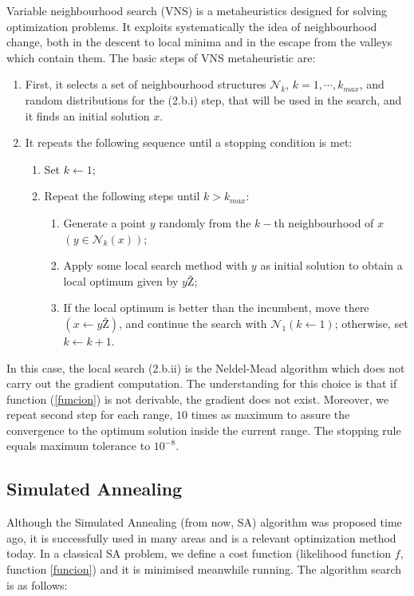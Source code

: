\documentclass{sig-alternate}
\begin{document}
Variable neighbourhood search (VNS) \cite{VNS} is a metaheuristics designed for solving optimization problems. It exploits systematically the idea of neighbourhood change, both in the descent to local minima and in the escape from the valleys which contain them. The basic steps of VNS metaheuristic are:

\begin{enumerate}
\item First, it selects a set of neighbourhood structures $\mathcal N_k$, $k=1,\cdots,k_{max}$, and random distributions for the (2.b.i) step, that will be used in the search, and it finds an initial solution $x$.
\item It repeats the following sequence until a stopping condition is met:
    \begin{enumerate}
        \item Set $k\leftarrow 1$;
        \item Repeat the following steps until $k>k_{max}$:
        \begin{enumerate}
            \item Generate a point $y$ randomly from the $k-$th neighbourhood of $x$ $(y\in\mathcal N_{k}(x))$;
                \item Apply some local search method with $y$ as initial solution to obtain a local optimum given by $yŽ$;
                \item If the local optimum is better than the incumbent, move there $(x\leftarrow yŽ)$, and continue the search with $\mathcal N_1 (k\leftarrow 1)$; otherwise, set $k\leftarrow k+1$.
        \end{enumerate}
    \end{enumerate}

\end{enumerate}

In this case, the local search (2.b.ii) is the Neldel-Mead algorithm \cite{NelderMead65} which does not carry out the gradient computation. The understanding for this choice is that if function (\ref{funcion}) is not derivable, the gradient does not exist. Moreover, we repeat second step for each range, $10$ times as maximum to assure the convergence to the optimum solution inside the current range. The stopping rule equals maximum tolerance to $10^{-8}$.





\subsection{Simulated Annealing}
\label{subsec:SA}
Although the Simulated Annealing (from now, SA) \cite{SA} algorithm was proposed time ago, it is successfully used in many areas and is a relevant optimization method today. In a classical SA \cite{SA} problem, we define a cost function (likelihood function $f$, function \ref{funcion}) and it is minimised meanwhile running.  The algorithm search is as follows:
\end{document}
